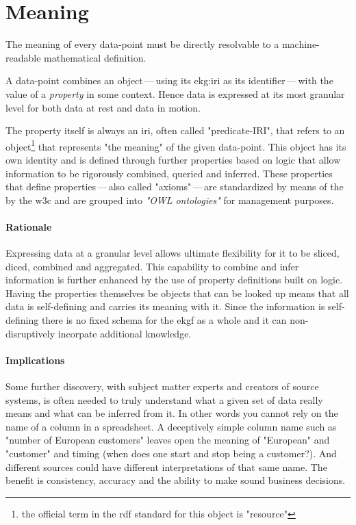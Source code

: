 \section{Meaning}\label{sec:ekg-principle-meaning}

The meaning of every \gls{data-point} must be directly resolvable
to a machine-readable mathematical definition.

A \gls{data-point} combines an object\,---\,using its \gls{ekg:iri} as its identifier\,---\,with the value
of a \textit{property} in some context.
Hence data is expressed at its most granular level for both data at rest and data in motion.

The property itself is always an \gls{iri}, often called "predicate-IRI", that refers to an object\footnote{%
    the official term in the \gls{rdf} standard for this object is "resource"%
} that represents "the meaning" of the given \gls{data-point}.
This object has its own identity and is defined through further properties
based on logic that allow information to be rigorously combined, queried and inferred.
These properties that define properties\,---\,also called "axioms"\,---\,are standardized by means of the 
by the \gls{w3c} and are grouped into \textit{"OWL ontologies"} for management purposes.


\paragraph{Rationale} Expressing data at a granular level allows ultimate flexibility
for it to be sliced, diced, combined and aggregated. This capability to combine and
infer information is further enhanced by the use of \gls{property} definitions built on logic.
Having the properties themselves be objects that can be looked up means that all data
is self-defining and carries its meaning with it.
Since the information is self-defining there is no fixed schema for the \gls{ekgf}
as a whole and it can non-disruptively incorpate additional knowledge.

\paragraph{Implications} Some further discovery, with subject matter experts and
creators of source systems, is often needed to truly understand what a given
set of data really means and what can be inferred from it.
In other words you cannot rely on the name of a column in a spreadsheet.
A deceptively simple column name such as "number of European customers" leaves
open the meaning of "European" and "customer" and timing (when does one start
and stop being a customer?). And different sources could have different
interpretations of that same name.
The benefit is consistency, accuracy and the ability to make sound business decisions.

